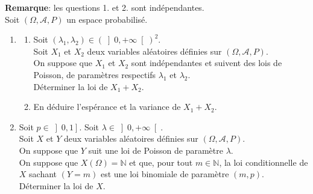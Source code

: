 \documentclass[10pt,oneside]{article}
\begin{document}
\begin{flushleft}
\textbf{Remarque}: les questions 1. et 2. sont indépendantes.\\
\medskip
Soit $(\Omega,\mathcal{A},P)$ un espace probabilisé.
\begin{enumerate}
\item 
\begin{enumerate}
\item
 Soit $\left( \lambda_1,\lambda_2 \right) \in \left( \left] 0,+\infty \right[\right) ^2$.\\
Soit $X_1$ et $X_2$ deux variables aléatoires définies sur $(\Omega,\mathcal{A},P)$.\\
On suppose que  $X_1$ et $X_2$ sont indépendantes et suivent des lois de Poisson, de paramètres respectifs  $\lambda_1$ et $\lambda_2$.\\
Déterminer la loi de $X_1+X_2$.\:\:\:\:
\item
En déduire l'espérance et la variance de $X_1+X_2$. \:\:\:\:
\end{enumerate}
\item 
Soit $p\in\left]  0,1\right]$. Soit $\lambda \in \left] 0,+\infty \right[$. \\ 
Soit $X$ et $Y$ deux variables aléatoires définies sur $(\Omega,\mathcal{A},P)$. \\
On suppose que  $Y$ suit une loi de Poisson de paramètre $\lambda$.\\
On suppose que $X(\Omega)=\mathbb{N}$ et que, pour tout $m\in\mathbb{N}$, la loi conditionnelle de $X$ sachant $(Y=m)$ est une loi binomiale de paramètre $(m,p)$.\\
Déterminer la loi de $X$.\:\:\:\:
\end{enumerate}



\end{flushleft}
\end{document}
